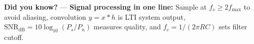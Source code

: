 \begin{tcolorbox}[
  colback=SoftYellow,
  colframe=IEEEblue!70!black,
  boxrule=0.5pt,
  arc=0mm,
  left=3mm, right=3mm, top=1mm, bottom=1mm
]
\small\RaggedRight \textbf{\color{IEEEblue!75!black}Did you know?} — \textbf{Signal processing in one line:} Sample at $f_s \ge 2f_{\max}$ to avoid aliasing, convolution $y=x*h$ is LTI system output, $\mathrm{SNR_{dB}}=10\log_{10}(P_s/P_n)$ measures quality, and $f_c=1/(2\pi RC)$ sets filter cutoff.
\end{tcolorbox}
